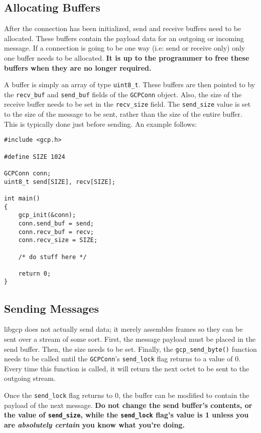 \documentclass{article}
\begin{document}
\subsection{Allocating Buffers}
After the connection has been initialized, send and receive buffers
need to be allocated.  These buffers contain the payload data for an
outgoing or incoming message.  If a connection is going to be one way
(i.e: send or receive only) only one buffer needs to be allocated.
\textbf{It is up to the programmer to free these buffers when they are
  no longer required.}

A buffer is simply an array of type \texttt{uint8\_t}.  These buffers
are then pointed to by the \texttt{recv\_buf} and \texttt{send\_buf}
fields of the \texttt{GCPConn} object.  Also, the size of the receive
buffer needs to be set in the \texttt{recv\_size} field.  The
\texttt{send\_size} value is set to the size of the message to be
sent, rather than the size of the entire buffer.  This is typically
done just before sending.  An example follows:
\begin{verbatim}
#include <gcp.h>

#define SIZE 1024

GCPConn conn;
uint8_t send[SIZE], recv[SIZE];

int main()
{
    gcp_init(&conn);
    conn.send_buf = send;
    conn.recv_buf = recv;
    conn.recv_size = SIZE;

    /* do stuff here */

    return 0;
}
\end{verbatim}

\subsection{Sending Messages}
libgcp does not actually send data; it merely assembles frames so they
can be sent over a stream of some sort.  First, the message payload
must be placed in the send buffer.  Then, the size needs to be set.
Finally, the \texttt{gcp\_send\_byte()} function needs to be called
until the \texttt{GCPConn}'s \texttt{send\_lock} flag returns to a
value of 0.  Every time this function is called, it will return the
next octet to be sent to the outgoing stream.

Once the \texttt{send\_lock} flag returns to 0, the buffer can be
modified to contain the payload of the next message.  \textbf{Do not
  change the send buffer's contents, or the value of
  \texttt{send\_size}, while the \texttt{send\_lock} flag's value is 1
  unless you are \emph{absolutely certain} you know what you're
  doing.}
\end{document}

